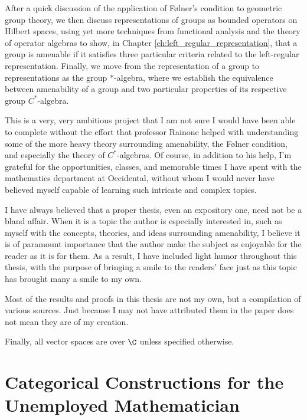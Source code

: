 \documentclass[10pt]{package2}
\begin{document}
After a quick discussion of the application of Følner's condition to geometric group theory, we then discuss representations of groups as bounded operators on Hilbert spaces, using yet more techniques from functional analysis and the theory of operator algebras to show, in Chapter \ref{ch:left_regular_representation}, that a group is amenable if it satisfies three particular criteria related to the left-regular representation. Finally, we move from the representation of a group to representations as the group $\ast$-algebra, where we establish the equivalence between amenability of a group and two particular properties of its respective group $C^{\ast}$-algebra.\newline

This is a very, very ambitious project that I am not sure I would have been able to complete without the effort that professor Rainone helped with understanding some of the more heavy theory surrounding amenability, the Følner condition, and especially the theory of $C^{\ast}$-algebras. Of course, in addition to his help, I'm grateful for the opportunities, classes, and memorable times I have spent with the mathematics department at Occidental, without whom I would never have believed myself capable of learning such intricate and complex topics.\newline

I have always believed that a proper thesis, even an expository one, need not be a bland affair. When it is a topic the author is especially interested in, such as myself with the concepts, theories, and ideas surrounding amenability, I believe it is of paramount importance that the author make the subject as enjoyable for the reader as it is for them. As a result, I have included light humor throughout this thesis, with the purpose of bringing a smile to the readers' face just as this topic has brought many a smile to my own.\newline

Most of the results and proofs in this thesis are not my own, but a compilation of various sources. Just because I may not have attributed them in the paper does not mean they are of my creation.\newline

Finally, all vector spaces are over $\C$ unless specified otherwise.
\chapter{Categorical Constructions for the Unemployed Mathematician}\label{ch:categorical_constructions}

\end{document}

